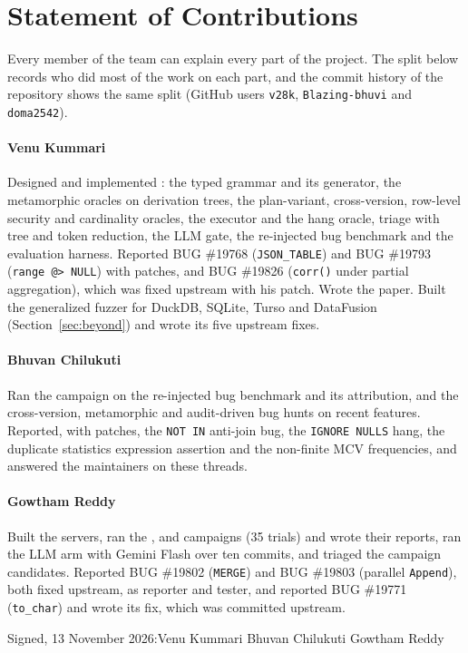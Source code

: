 \section*{Statement of Contributions}
\label{sec:contrib}
Every member of the team can explain every part of the project. The split below
records who did most of the work on each part, and the commit history of the
repository shows the same split (GitHub users \texttt{v28k}, \texttt{Blazing-bhuvi}
and \texttt{doma2542}).

\paragraph{Venu Kummari} Designed and implemented \tool: the typed grammar and
its generator, the metamorphic oracles on derivation trees, the plan-variant,
cross-version, row-level security and cardinality oracles, the executor and the
hang oracle, triage with tree and token reduction, the LLM gate, the re-injected
bug benchmark and the evaluation harness. Reported BUG \#19768
(\texttt{JSON\_TABLE}) and BUG \#19793 (\texttt{range @> NULL}) with patches,
and BUG \#19826 (\texttt{corr()} under partial aggregation), which was fixed
upstream with his patch. Wrote the paper. Built the generalized fuzzer for
DuckDB, SQLite, Turso and DataFusion (Section~\ref{sec:beyond}) and wrote its
five upstream fixes.

\paragraph{Bhuvan Chilukuti} Ran the  campaign on the re-injected bug
benchmark and its attribution, and the cross-version, metamorphic and
audit-driven bug hunts on recent \pg features. Reported, with patches, the
\texttt{NOT IN} anti-join bug, the \texttt{IGNORE NULLS} hang, the duplicate
statistics expression assertion and the non-finite MCV frequencies, and answered
the maintainers on these threads.

\paragraph{Gowtham Reddy} Built the servers, ran the ,  and
 campaigns (35 trials) and wrote their reports, ran the LLM arm with
Gemini Flash over ten commits, and triaged the campaign candidates. Reported BUG
\#19802 (\texttt{MERGE}) and BUG \#19803 (parallel \texttt{Append}), both fixed
upstream, as reporter and tester, and reported BUG \#19771 (\texttt{to\_char})
and wrote its fix, which was committed upstream.

\medskip
\noindent Signed, 13 November 2026:\quad Venu Kummari \quad Bhuvan Chilukuti \quad Gowtham Reddy
